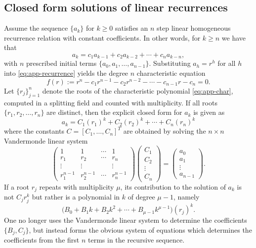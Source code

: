\documentclass[11pt,reqno]{amsart}
\theoremstyle{remark}
\begin{document}
\subsection{Closed form solutions of linear recurrences}
Assume the sequence $\{a_{k}\}$ for $k \geq 0$ satisfies an $n$ step linear homogeneous recurrence relation with constant
coefficients.  In other words, for $k \ge n$ we have that
\begin{equation}
\label{eq:app-recurrence}
a_k = c_1a_{k-1}+c_2a_{k-2}+\cdots+c_na_{k-n},
\end{equation}
with $n$ prescribed initial terms $\{a_0,a_1,\dots,a_{n-1}\}$.
Substituting $a_h=r^h$ for all $h$ into \eqref{eq:app-recurrence} yields the
degree $n$ characteristic equation
\begin{equation}
\label{eq:app-char}
f(r):= r^n - c_1r^{n-1} - c_2r^{n-2} - \cdots - c_{n-1}r - c_n = 0.
\end{equation}
Let $\{r_{j}\}_{j=1}^n$ denote the roots of the characteristic polynomial \eqref{eq:app-char}, computed
in a splitting field and counted with multiplicity.
If all roots $\{r_1,r_2,\dots,r_n\}$ are distinct, then the explicit closed
form for $a_{k}$ is given as
\begin{equation}
\label{eq:app-distinct}
a_k = C_1(r_1)^k+C_2(r_2)^k+\cdots+C_n(r_n)^k
\end{equation}
where the constants $C=[C_1,\dots,C_n]^T$ are obtained by solving the
$n\times n$ Vandermonde linear system
\[
\begin{pmatrix}1&1&\cdots&1\\r_1&r_2&\cdots&r_n\\\vdots&\vdots&&\vdots\\r_1^{n-1}&r_2^{n-1}&\cdots&r_n^{n-1}\end{pmatrix}
\begin{pmatrix}C_1\\C_2\\\vdots\\C_n\end{pmatrix} = \begin{pmatrix}a_0\\a_1\\\vdots\\a_{n-1}\end{pmatrix}.
\]
If a root $r_j$ repeats with multiplicity $\mu$, its
contribution to the solution of $a_{k}$ is not $C_{j}r_{j}^k$ but rather is
a polynomial in $k$ of degree $\mu-1$, namely
\begin{equation}
\label{eq:app-repeated}
\big(B_0+B_1k+B_2k^2+\cdots+B_{\mu-1}k^{\mu-1}\big)(r_j)^k.
\end{equation}
One no longer uses the Vandermonde linear system to determine the coefficients $\{B_{j}, C_{j}\}$,
but instead forms the obvious system of equations which determines the coefficients from the first
$n$ terms in the recursive sequence.
\end{document}

